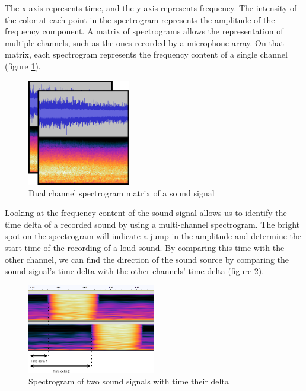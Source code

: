 The x-axis represents time, and the y-axis represents frequency. The intensity of the color at each point in the spectrogram represents the amplitude of the frequency component. A matrix of spectrograms allows the representation of multiple channels, such as the ones recorded by a microphone array. On that matrix, each spectrogram represents the frequency content of a single channel (figure \ref*{fig:2_channel_spectrogram_example}).

\begin{figure}[H]
    \centering
    \includegraphics[width=0.4\textwidth]{../Images/2-channel-spectrogram-example.png}
    \caption{Dual channel spectrogram matrix of a sound signal}
    \label{fig:2_channel_spectrogram_example}
\end{figure}

Looking at the frequency content of the sound signal allows us to identify the time delta of a recorded sound by using a multi-channel spectrogram. The bright spot on the spectrogram will indicate a jump in the amplitude and determine the start time of the recording of a loud sound. By comparing this time with the other channel, we can find the direction of the sound source by comparing the sound signal's time delta with the other channels' time delta (figure \ref*{fig:spectrogram_offset}).

\begin{figure}[H]
    \centering
    \includegraphics[width=0.5\textwidth]{../Images/time_delta.png}
    \caption{Spectrogram of two sound signals with time their delta}
    \label{fig:spectrogram_offset}
\end{figure}

